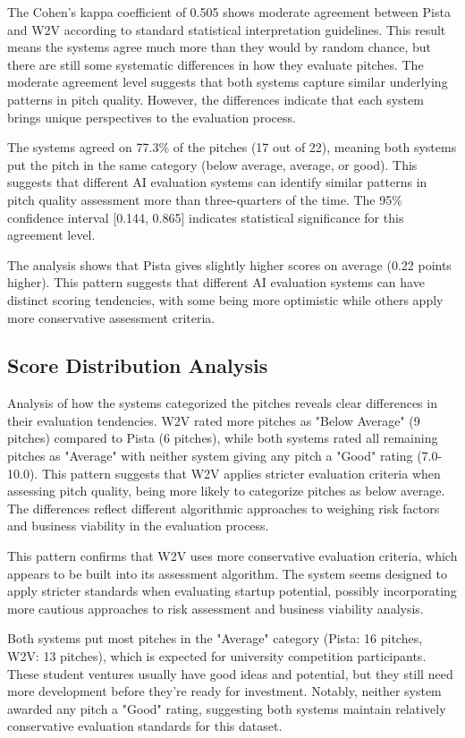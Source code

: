 The Cohen's kappa coefficient of 0.505 shows moderate agreement between Pista and W2V according to standard statistical interpretation guidelines. This result means the systems agree much more than they would by random chance, but there are still some systematic differences in how they evaluate pitches. The moderate agreement level suggests that both systems capture similar underlying patterns in pitch quality. However, the differences indicate that each system brings unique perspectives to the evaluation process.

The systems agreed on 77.3\% of the pitches (17 out of 22), meaning both systems put the pitch in the same category (below average, average, or good). This suggests that different AI evaluation systems can identify similar patterns in pitch quality assessment more than three-quarters of the time. The 95\% confidence interval [0.144, 0.865] indicates statistical significance for this agreement level.

The analysis shows that Pista gives slightly higher scores on average (0.22 points higher). This pattern suggests that different AI evaluation systems can have distinct scoring tendencies, with some being more optimistic while others apply more conservative assessment criteria.

\subsection{Score Distribution Analysis}

Analysis of how the systems categorized the pitches reveals clear differences in their evaluation tendencies. W2V rated more pitches as "Below Average" (9 pitches) compared to Pista (6 pitches), while both systems rated all remaining pitches as "Average" with neither system giving any pitch a "Good" rating (7.0-10.0). This pattern suggests that W2V applies stricter evaluation criteria when assessing pitch quality, being more likely to categorize pitches as below average. The differences reflect different algorithmic approaches to weighing risk factors and business viability in the evaluation process.

This pattern confirms that W2V uses more conservative evaluation criteria, which appears to be built into its assessment algorithm. The system seems designed to apply stricter standards when evaluating startup potential, possibly incorporating more cautious approaches to risk assessment and business viability analysis.

Both systems put most pitches in the "Average" category (Pista: 16 pitches, W2V: 13 pitches), which is expected for university competition participants. These student ventures usually have good ideas and potential, but they still need more development before they're ready for investment. Notably, neither system awarded any pitch a "Good" rating, suggesting both systems maintain relatively conservative evaluation standards for this dataset.

